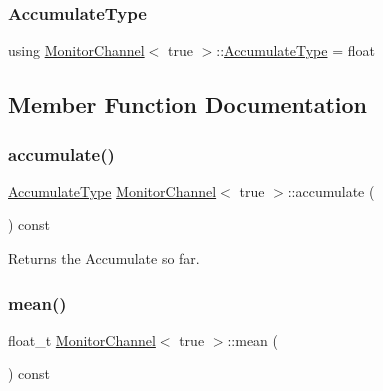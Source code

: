 \subsubsection{\texorpdfstring{Accumulate\+Type}{AccumulateType}}
{\footnotesize\ttfamily using \hyperlink{classMonitorChannel}{Monitor\+Channel}$<$ true $>$\+::\hyperlink{classMonitorChannel_3_01true_01_4_af2569e58417243595e129831ac287351}{Accumulate\+Type} =  float\hspace{0.3cm}{\ttfamily [private]}}



\subsection{Member Function Documentation}
\mbox{\label{classMonitorChannel_3_01true_01_4_ade0e235d1f9f6f1624d898e8047b4026}} 
\subsubsection{\texorpdfstring{accumulate()}{accumulate()}}
{\footnotesize\ttfamily \hyperlink{classMonitorChannel_3_01true_01_4_af2569e58417243595e129831ac287351}{Accumulate\+Type} \hyperlink{classMonitorChannel}{Monitor\+Channel}$<$ true $>$\+::accumulate (\begin{DoxyParamCaption}{ }\end{DoxyParamCaption}) const\hspace{0.3cm}{\ttfamily [inline]}}



Returns the {\ttfamily Accumulate} so far. 

\mbox{\label{classMonitorChannel_3_01true_01_4_a7b95a313ea0263842ff6190d38ff7d7f}} 
\subsubsection{\texorpdfstring{mean()}{mean()}}
{\footnotesize\ttfamily float\+\_\+t \hyperlink{classMonitorChannel}{Monitor\+Channel}$<$ true $>$\+::mean (\begin{DoxyParamCaption}{ }\end{DoxyParamCaption}) const\hspace{0.3cm}{\ttfamily [inline]}}



